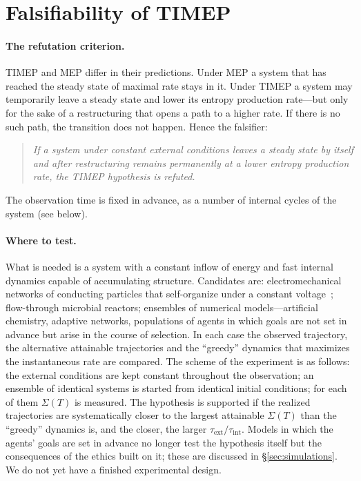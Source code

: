 \documentclass[11pt,a4paper]{article}
\newcommand{\Sref}[1]{\hyperref[#1]{\S\ref{#1}}}
\begin{document}
\section{Falsifiability of TIMEP}\label{sec:test}

\paragraph{The refutation criterion.}
TIMEP and MEP differ in their predictions. Under MEP a system that has reached the steady state of maximal rate stays in it. Under TIMEP a system may temporarily leave a steady state and lower its entropy production rate---but only for the sake of a restructuring that opens a path to a higher rate. If there is no such path, the transition does not happen. Hence the falsifier:

\begin{quote}
\emph{If a system under constant external conditions leaves a steady state by itself and after restructuring remains permanently at a lower entropy production rate, the TIMEP hypothesis is refuted.}
\end{quote}

The observation time is fixed in advance, as a number of internal cycles of the system (see below).

\paragraph{Where to test.}
What is needed is a system with a constant inflow of energy and fast internal dynamics capable of accumulating structure. Candidates are: electromechanical networks of conducting particles that self-organize under a constant voltage~\cite{jun2005}; flow-through microbial reactors; ensembles of numerical models---artificial chemistry, adaptive networks, populations of agents in which goals are not set in advance but arise in the course of selection. In each case the observed trajectory, the alternative attainable trajectories and the ``greedy'' dynamics that maximizes the instantaneous rate are compared. The scheme of the experiment is as follows: the external conditions are kept constant throughout the observation; an ensemble of identical systems is started from identical initial conditions; for each of them $\Sigma(T)$ is measured. The hypothesis is supported if the realized trajectories are systematically closer to the largest attainable $\Sigma(T)$ than the ``greedy'' dynamics is, and the closer, the larger $\tau_{\mathrm{ext}}/\tau_{\mathrm{int}}$. Models in which the agents' goals are set in advance no longer test the hypothesis itself but the consequences of the ethics built on it; these are discussed in \Sref{sec:simulations}. We do not yet have a finished experimental design.
\end{document}
